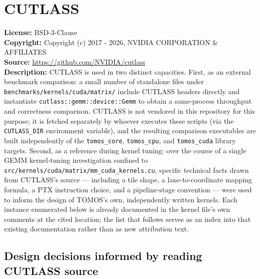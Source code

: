 \documentclass[11pt]{article}
\newcommand{\field}[2]{\noindent\textbf{#1:} #2\\}
\begin{document}
\section{CUTLASS}

\field{License}{BSD-3-Clause}
\field{Copyright}{Copyright (c) 2017 - 2026, NVIDIA CORPORATION \& AFFILIATES}
\field{Source}{\url{https://github.com/NVIDIA/cutlass}}

\noindent
\textbf{Description:} CUTLASS is used in two distinct capacities. First, as
an external benchmark comparison: a small number of standalone files under
\texttt{benchmarks/kernels/cuda/matrix/} include CUTLASS headers directly
and instantiate \texttt{cutlass::gemm::device::Gemm} to obtain a
same-process throughput and correctness comparison. CUTLASS is not
vendored in this repository for this purpose; it is fetched separately by
whoever executes these scripts (via the \texttt{CUTLASS\_DIR} environment
variable), and the resulting comparison executables are built independently
of the \texttt{tomos\_core}, \texttt{tomos\_cpu}, and \texttt{tomos\_cuda}
library targets. Second, as a reference during kernel tuning: over the
course of a single GEMM kernel-tuning investigation confined to
\texttt{src/kernels/cuda/matrix/mm\_cuda\_kernels.cu}, specific technical
facts drawn from CUTLASS's source --- including a tile shape, a
lane-to-coordinate mapping formula, a PTX instruction choice, and a
pipeline-stage convention --- were used to inform the design of TOMOS's
own, independently written kernels. Each instance enumerated below is
already documented in the kernel file's own comments at the cited
location; the list that follows serves as an index into that existing
documentation rather than as new attribution text.

\subsection*{Design decisions informed by reading CUTLASS source}
\end{document}
